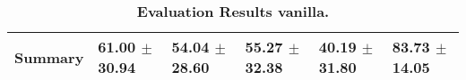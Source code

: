 \begin{table}[htb]
{\begin{tabular}{llllll}
\midrule
\textbf{Summary                                  } &                  \phantom{0}61.00 $\pm$ 30.94 &                      \phantom{0}54.04 $\pm$ 28.60 &                  \phantom{0}55.27 $\pm$ 32.38 &                  \phantom{0}40.19 $\pm$ 31.80 &            \phantom{0}83.73 $\pm$ 14.05 \\
\bottomrule
\end{tabular}%
}
\caption{\textbf{Evaluation Results vanilla.}}
\label{tab:eval-results}
\end{table}


